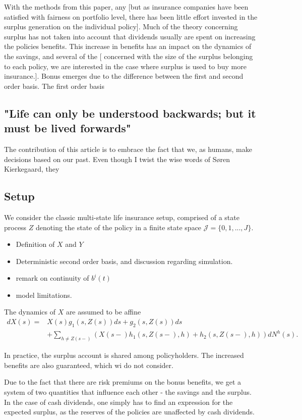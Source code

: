 \documentclass[12pt]{article}
\begin{document}
 With the methods from this paper, any [but as insurance companies have been satisfied with fairness on portfolio level, there has been little effort invested in the surplus generation on the individual policy]. Much of the theory concerning surplus has not taken into account that dividends usually are spent on increasing the policies benefits. This increase in benefits has an impact on the dynamics of the savings, and several of the  [\citep{NorbergB} concerned with the size of the surplus belonging to each policy, we are interested in the case where surplus is used to buy more insurance.]. Bonus emerges due to the difference between the first and second order basis. The first order basis

\subsection*{"Life can only be understood backwards; but it must be lived forwards"}
The contribution of this article is to embrace the fact that we, as humans, make decisions based on our past.  Even though I twist the wise words of Søren Kierkegaard, they 

\subsection*{Setup}
We consider the classic multi-state life insurance setup, comprised of a state process $Z$ denoting the state of the policy in a finite state space $\mathcal{J}=\{0,1,...,J\}$. 
\begin{itemize}
\item Definition of $X$ and $Y$
\item Deterministic second order basis, and discussion regarding simulation.
\item remark on continuity of $b^i(t)$
\item model limitations.
\end{itemize}
The dynamics of $X$ are assumed to be affine
\begin{align*}
dX(s)=&X(s)g_1(s,Z(s))ds+g_2(s,Z(s))ds\\
&+\sum_{h\neq Z(s-)} \left( X(s-)h_1(s,Z(s-),h)+ h_2(s,Z(s-),h)\right) dN^h(s).
\end{align*}

In practice, the surplus account is shared among policyholders. The increased benefits are also guaranteed, which wi do not consider.

Due to the fact that there are risk premiums on the bonus benefits, we get a system of two quantities that influence each other - the savings and the surplus. In the case of cash dividends, one simply has to find an expression for the expected surplus, as the reserves of the policies are unaffected by cash dividends.
\end{document}
